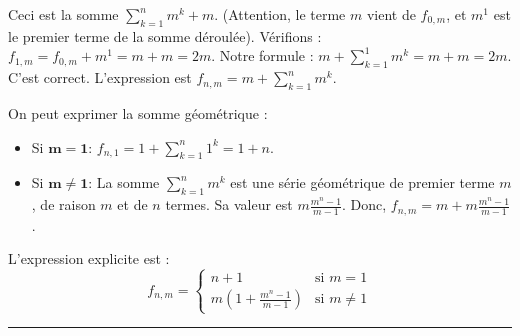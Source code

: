 \documentclass[12pt]{article}
\begin{document}
Ceci est la somme $\sum_{k=1}^{n} m^k + m$. (Attention, le terme $m$ vient de $f_{0,m}$, et $m^1$ est le premier terme de la somme déroulée).
Vérifions : $f_{1,m} = f_{0,m} + m^1 = m+m=2m$. Notre formule : $m + \sum_{k=1}^{1} m^k = m+m=2m$. C'est correct.
L'expression est $f_{n,m} = m + \sum_{k=1}^{n} m^k$.

On peut exprimer la somme géométrique :
\begin{itemize}
    \item Si $\boldsymbol{m = 1}$:
    $f_{n,1} = 1 + \sum_{k=1}^{n} 1^k = 1 + n$.
    
    \item Si $\boldsymbol{m \neq 1}$:
    La somme $\sum_{k=1}^{n} m^k$ est une série géométrique de premier terme $m$, de raison $m$ et de $n$ termes. Sa valeur est $m \frac{m^n - 1}{m-1}$.
    Donc, $f_{n,m} = m + m \frac{m^n - 1}{m-1}$.
\end{itemize}
L'expression explicite est :
$$ f_{n,m} = \begin{cases} n+1 & \text{si } m = 1 \\ m \left( 1 + \frac{m^n - 1}{m-1} \right) & \text{si } m \neq 1 \end{cases} $$

\vspace{1em}
\hrule
\vspace{1em}
\end{document}
